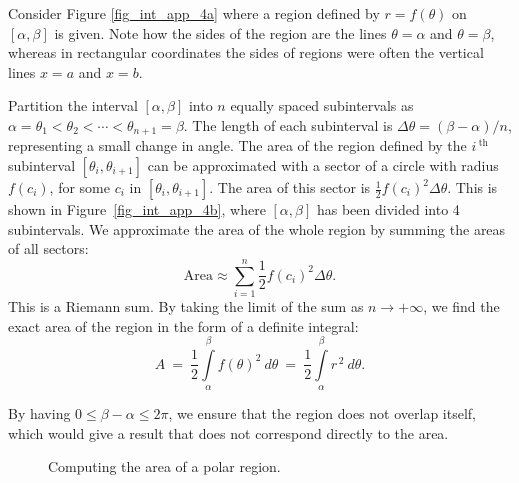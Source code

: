Consider Figure \ref{fig_int_app_4a}  where a region defined by $r=f(\theta)$ on $[\alpha,\beta]$ is given. Note how the sides of the region are the lines $\theta=\alpha$ and $\theta=\beta$, whereas in rectangular coordinates the sides of regions were often the vertical lines $x=a$ and $x=b$. 

Partition the interval $[\alpha,\beta]$ into $n$ equally spaced subintervals as $\alpha = \theta_1 < \theta_2 <\cdots <\theta_{n+1}=\beta$. The length of each subinterval is $\Delta\theta = (\beta-\alpha)/n$, representing a small change in angle. The area of the region defined by the $i\,^\text{th}$ subinterval $[\theta_i,\theta_{i+1}]$ can be approximated with a sector of a circle with radius $f(c_i)$, for some $c_i$ in $[\theta_i,\theta_{i+1}]$. The area of this sector is $\frac12f(c_i)^2\Delta\theta$. This is shown in Figure~\ref{fig_int_app_4b}, where $[\alpha,\beta]$ has been divided into 4 subintervals. We approximate the area of the whole region by summing the areas of all sectors:
$$\text{Area} \approx \sum_{i=1}^n \frac12f(c_i)^2\Delta\theta.$$
This is a Riemann sum. By taking the limit of the sum as $n\to +\infty$, we find the exact area of the region in the form of a definite integral:
\begin{equation}
A \ =\  \frac12\int\limits_\alpha^\beta f(\theta)^2 \ d\theta\  =\  \frac12\int\limits_\alpha^\beta r^{\,2} \ d\theta.
\label{thm:polar_area}
\end{equation}

By having $0\leq \beta-\alpha\leq 2\pi$, we ensure that the region does not overlap itself, which would give a result that does not correspond directly to the area.

\begin{figure}[h]
\centering
\qquad
{}
\caption{Computing the area of a polar region.}
\end{figure}

